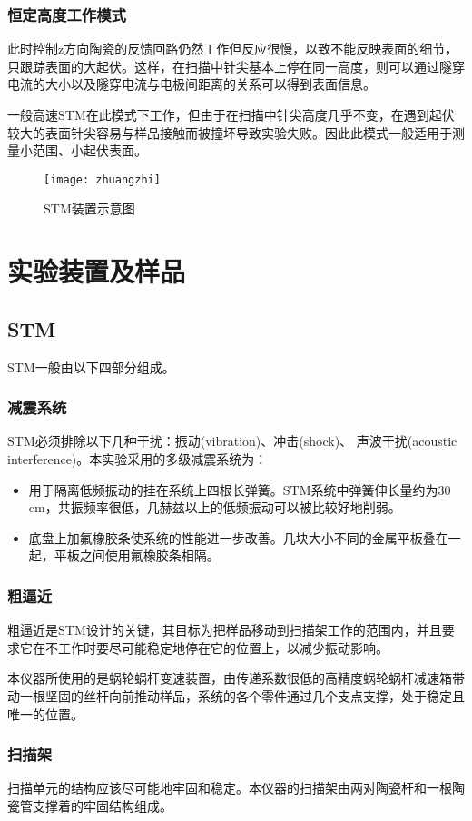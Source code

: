 \documentclass[aps,pre,12pt,preprint,onecolumn,showpacs,showkeys]{revtex4-1}
\begin{document}
\subsubsection{恒定高度工作模式}
此时控制z方向陶瓷的反馈回路仍然工作但反应很慢，以致不能反映表面的细节，只跟踪表面的大起伏。这样，在扫描中针尖基本上停在同一高度，则可以通过隧穿电流的大小以及隧穿电流与电极间距离的关系可以得到表面信息。\par
一般高速STM在此模式下工作，但由于在扫描中针尖高度几乎不变，在遇到起伏较大的表面针尖容易与样品接触而被撞坏导致实验失败。因此此模式一般适用于测量小范围、小起伏表面。


\begin{figure}[h]
\centering
\texttt{[image: zhuangzhi]}
\centering
\caption{\label{fig:图1}%
STM装置示意图}
\end{figure}



\section{实验装置及样品}
\subsection{STM}
STM一般由以下四部分组成。
\subsubsection{减震系统}
STM必须排除以下几种干扰：振动(vibration)、冲击(shock)、 声波干扰(acoustic interference)。本实验采用的多级减震系统为：
\begin{itemize}
\item 用于隔离低频振动的挂在系统上四根长弹簧。STM系统中弹簧伸长量约为30 cm，共振频率很低，几赫兹以上的低频振动可以被比较好地削弱。
\item 底盘上加氟橡胶条使系统的性能进一步改善。几块大小不同的金属平板叠在一起，平板之间使用氟橡胶条相隔。
\end{itemize}
\subsubsection{粗逼近}
粗逼近是STM设计的关键，其目标为把样品移动到扫描架工作的范围内，并且要求它在不工作时要尽可能稳定地停在它的位置上，以减少振动影响。\par
本仪器所使用的是蜗轮蜗杆变速装置，由传递系数很低的高精度蜗轮蜗杆减速箱带动一根坚固的丝杆向前推动样品，系统的各个零件通过几个支点支撑，处于稳定且唯一的位置。
\subsubsection{扫描架}
扫描单元的结构应该尽可能地牢固和稳定。本仪器的扫描架由两对陶瓷杆和一根陶瓷管支撑着的牢固结构组成。
\end{document}
